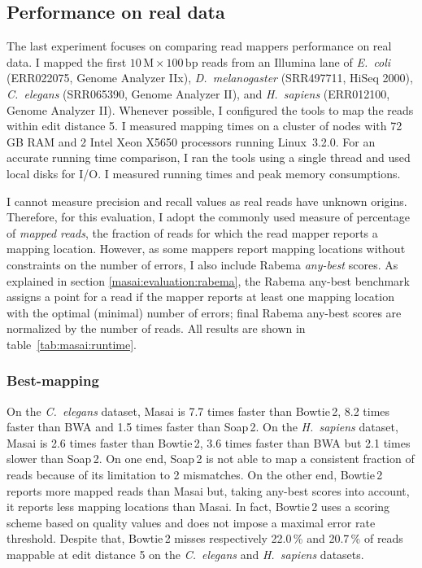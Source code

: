 \subsection{Performance on real data}
\label{masai:evaluation:performance}

The last experiment focuses on comparing read mappers performance on real data.
I mapped the first $10\,\text{M}\times 100\,\text{bp}$ reads from an Illumina lane of \emph{E.~coli} (ERR022075, Genome Analyzer IIx), \emph{D.~melanogaster} (SRR497711, HiSeq 2000), \emph{C.~elegans} (SRR065390, Genome Analyzer II), and \emph{H.~sapiens} (ERR012100, Genome Analyzer II).
Whenever possible, I configured the tools to map the reads within edit distance 5.
I measured mapping times on a cluster of nodes with 72\,GB RAM and 2 Intel Xeon X5650 processors running Linux~3.2.0.
For an accurate running time comparison, I ran the tools using a single thread and used local disks for I/O.
I measured running times and peak memory consumptions.

I cannot measure precision and recall values as real reads have unknown origins.
Therefore, for this evaluation, I adopt the commonly used measure of percentage of \emph{mapped reads}, \ie the fraction of reads for which the read mapper reports a mapping location.
However, as some mappers report mapping locations without constraints on the number of errors, I also include Rabema \emph{any-best} scores.
As explained in section \ref{masai:evaluation:rabema}, the Rabema any-best benchmark assigns a point for a read if the mapper reports at least one mapping location with the optimal (\ie minimal) number of errors;
final Rabema any-best scores are normalized by the number of reads.
All results are shown in table~\ref{tab:masai:runtime}.

\subsubsection{Best-mapping}
On the \emph{C.~elegans} dataset, Masai is 7.7 times faster than Bowtie\,2, 8.2 times faster than BWA and 1.5 times faster than Soap\,2.
On the \emph{H.~sapiens} dataset, Masai is 2.6 times faster than Bowtie\,2, 3.6 times faster than BWA but 2.1 times slower than Soap\,2.
On one end, Soap\,2 is not able to map a consistent fraction of reads because of its limitation to 2 mismatches.
On the other end, Bowtie\,2 reports more mapped reads than Masai but, taking any-best scores into account, it reports less mapping locations than Masai.
In fact, Bowtie\,2 uses a scoring scheme based on quality values and does not impose a maximal error rate threshold.
Despite that, Bowtie\,2 misses respectively 22.0\,\% and 20.7\,\% of reads mappable at edit distance 5 on the \emph{C.~elegans} and \emph{H.~sapiens} datasets.

